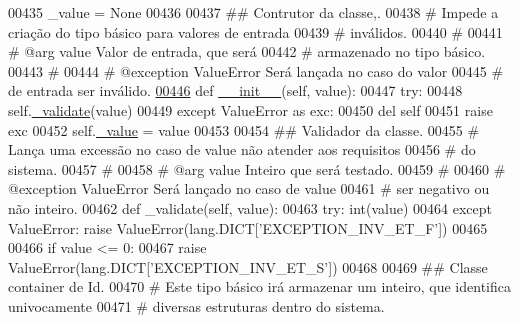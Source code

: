 \begin{DoxyCode}
00435     \_value = \textcolor{keywordtype}{None}
00436 
00437     \textcolor{comment}{## Contrutor da classe,.}
00438     \textcolor{comment}{#   Impede a criação do tipo básico para valores de entrada}
00439     \textcolor{comment}{#   inválidos.}
00440     \textcolor{comment}{#}
00441     \textcolor{comment}{#   @arg        value       Valor de entrada, que será}
00442     \textcolor{comment}{#                           armazenado no tipo básico.}
00443     \textcolor{comment}{#}
00444     \textcolor{comment}{#   @exception  ValueError  Será lançada no caso do valor}
00445     \textcolor{comment}{#                           de entrada ser inválido.}
\hypertarget{BaseUnit_8py_source_l00446}{}\hyperlink{classELO_1_1BaseUnit_1_1ExType_ae1e5e0b555574e9f8514c0571720ae83}{00446}     \textcolor{keyword}{def }\hyperlink{classELO_1_1BaseUnit_1_1ExType_ae1e5e0b555574e9f8514c0571720ae83}{\_\_init\_\_}(self, value):
00447         \textcolor{keywordflow}{try}:
00448             self.\hyperlink{classELO_1_1BaseUnit_1_1IfBaseType_acf84c5906a39b605a23ab68c4ca1dd19}{\_validate}(value)
00449         \textcolor{keywordflow}{except} ValueError \textcolor{keyword}{as} exc:
00450             del self
00451             \textcolor{keywordflow}{raise} exc
00452         self.\hyperlink{classELO_1_1BaseUnit_1_1IfBaseType_ad05d9d377fc4b99743c022cc8f6019d7}{\_value} = value
00453 
00454     \textcolor{comment}{## Validador da classe.}
00455     \textcolor{comment}{#   Lança uma excessão no caso de value não atender aos requisitos}
00456     \textcolor{comment}{#   do sistema.}
00457     \textcolor{comment}{#}
00458     \textcolor{comment}{#   @arg        value       Inteiro que será testado.}
00459     \textcolor{comment}{#}
00460     \textcolor{comment}{#   @exception  ValueError  Será lançado no caso de value}
00461     \textcolor{comment}{#                           ser negativo ou não inteiro.}
00462     \textcolor{keyword}{def }\_validate(self, value):
00463         \textcolor{keywordflow}{try}: int(value)
00464         \textcolor{keywordflow}{except} ValueError: \textcolor{keywordflow}{raise} ValueError(lang.DICT[\textcolor{stringliteral}{'EXCEPTION\_INV\_ET\_F'}])
00465 
00466         \textcolor{keywordflow}{if} value <= 0:
00467             \textcolor{keywordflow}{raise} ValueError(lang.DICT[\textcolor{stringliteral}{'EXCEPTION\_INV\_ET\_S'}])
00468 
00469 \textcolor{comment}{## Classe container de Id.}
00470 \textcolor{comment}{#   Este tipo básico irá armazenar um inteiro, que identifica univocamente}
00471 \textcolor{comment}{#   diversas estruturas dentro do sistema.}

\end{DoxyCode}
